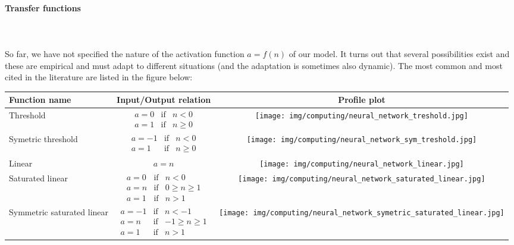 	\paragraph{Transfer functions}\mbox{}\\\\
	So far, we have not specified the nature of the activation function $a=f(n)$ of our model. It turns out that several possibilities exist and these are empirical and must adapt to different situations (and the adaptation is sometimes also dynamic). The most common and most cited in the literature are listed in the figure below:
	\begin{table}[H]
		\begin{center}
				\begin{tabular}{|l||c|c|}
					\hline
					{\cellcolor{black!30}Function name} & {\cellcolor{black!30}Input/Output relation} & {\cellcolor{black!30}Profile plot}  \\ \hline
					Threshold & $\begin{matrix}a=0 & \text{if} & n<0\\a=1 & \text{if} & n\geq 0 \end{matrix}$ & \parbox{1.5cm}{\texttt{[image: img/computing/neural\_network\_treshold.jpg]}}\\ \hline
					Symetric threshold & $\begin{matrix}a=-1 & \text{if} & n<0\\a=1 & \text{if} & n\geq 0 \end{matrix}$ & \parbox{1.5cm}{\texttt{[image: img/computing/neural\_network\_sym\_treshold.jpg]}}\\ \hline
					Linear & $a=n$ & \parbox{1.5cm}{\texttt{[image: img/computing/neural\_network\_linear.jpg]}}\\ \hline
					Saturated linear & $\begin{matrix}a=0 & \text{if} & n<0\\a=n & \text{if} & 0\geq n \geq 1\\ a=1 & \text{if} & n>1 \end{matrix}$ & \parbox{1.5cm}{\texttt{[image: img/computing/neural\_network\_saturated\_linear.jpg]}}\\  \hline
					Symmetric saturated linear & $\begin{matrix}a=-1 & \text{if} & n<-1\\a=n & \text{if} & -1\geq n \geq 1\\ a=1 & \text{if} & n>1 \end{matrix}$ & \parbox{1.5cm}{\texttt{[image: img/computing/neural\_network\_symetric\_saturated\_linear.jpg]}}\\ \hline

\end{tabular}
\end{center}
\end{table}
